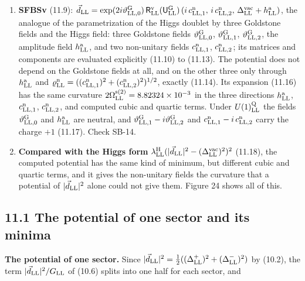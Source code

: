 \documentclass[
  10pt,
]{article}
\begin{document}
\begin{enumerate}
\item
  \textbf{SFBSv} (11.9):
  \(\vec d_{\rm LL}=\exp(2i\vartheta^{\rm G}_{{\rm LL},0})\,\mathsf R^{\rm v}_{\rm LL}(\mathsf U^{\rm G}_{\rm LL})\,(i\,c^{\rm n}_{{\rm LL},1},\,i\,c^{\rm n}_{{\rm LL},2},\,\Delta^{\rm vac}_{\rm LL}+h^{\rm a}_{\rm LL})\),
  the analogue of the parametrization of the Higgs doublet by three
  Goldstone fields and the Higgs field: three Goldstone fields
  \(\vartheta^{\rm G}_{{\rm LL},0}\),
  \(\vartheta^{\rm G}_{{\rm LL},1}\),
  \(\vartheta^{\rm G}_{{\rm LL},2}\), the amplitude field
  \(h^{\rm a}_{\rm LL}\), and two non-unitary fields
  \(c^{\rm n}_{{\rm LL},1}\), \(c^{\rm n}_{{\rm LL},2}\); its matrices
  and components are evaluated explicitly (11.10) to (11.13). The
  potential does not depend on the Goldstone fields at all, and on the
  other three only through \(h^{\rm a}_{\rm LL}\) and
  \(\varrho^{\rm n}_{\rm LL}=((c^{\rm n}_{{\rm LL},1})^2+(c^{\rm n}_{{\rm LL},2})^2)^{1/2}\),
  exactly (11.14). Its expansion (11.16) has the same curvature
  \(2\Omega^{\rm s(2)}_{\rm LL}=8.82324\times10^{-3}\) in the three
  directions \(h^{\rm a}_{\rm LL}\), \(c^{\rm n}_{{\rm LL},1}\),
  \(c^{\rm n}_{{\rm LL},2}\), and computed cubic and quartic terms.
  Under \(U(1)^{\rm Q}_{\rm LL}\) the fields
  \(\vartheta^{\rm G}_{{\rm LL},0}\) and \(h^{\rm a}_{\rm LL}\) are
  neutral, and
  \(\vartheta^{\rm G}_{{\rm LL},1}-i\vartheta^{\rm G}_{{\rm LL},2}\) and
  \(c^{\rm n}_{{\rm LL},1}-i\,c^{\rm n}_{{\rm LL},2}\) carry the charge
  \(+1\) (11.17). Check SB-14.
\item
  \textbf{Compared with the Higgs form}
  \(\lambda^{\rm H}_{\rm LL}(\lvert\vec d_{\rm LL}\rvert^2-(\Delta^{\rm vac}_{\rm LL})^2)^2\)
  (11.18), the computed potential has the same kind of minimum, but
  different cubic and quartic terms, and it gives the non-unitary fields
  the curvature that a potential of \(\lvert\vec d_{\rm LL}\rvert^2\)
  alone could not give them. Figure 24 shows all of this.
\end{enumerate}

\hypertarget{the-potential-of-one-sector-and-its-minima}{%
\subsection{11.1 The potential of one sector and its
minima}\label{the-potential-of-one-sector-and-its-minima}}

\textbf{The potential of one sector.} Since
\(\lvert\vec d_{\rm LL}\rvert^2=\tfrac12((\Delta^+_{\rm LL})^2+(\Delta^-_{\rm LL})^2)\)
by (10.2), the term \(\lvert\vec d_{\rm LL}\rvert^2/G_{\rm LL}\) of
(10.6) splits into one half for each sector, and
\end{document}
